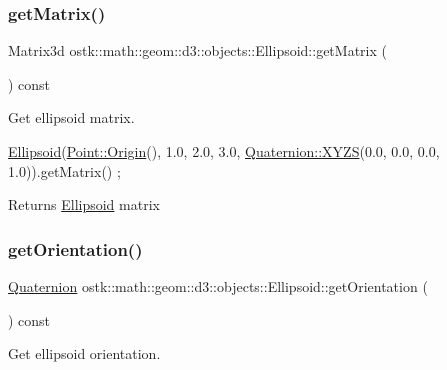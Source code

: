 \subsubsection{\texorpdfstring{get\+Matrix()}{getMatrix()}}
{\footnotesize\ttfamily Matrix3d ostk\+::math\+::geom\+::d3\+::objects\+::\+Ellipsoid\+::get\+Matrix (\begin{DoxyParamCaption}{ }\end{DoxyParamCaption}) const}



Get ellipsoid matrix. 


\begin{DoxyCode}
\hyperlink{classostk_1_1math_1_1geom_1_1d3_1_1objects_1_1_ellipsoid_a106c71abf9503f3d06b2613c1c7e9d65}{Ellipsoid}(\hyperlink{classostk_1_1math_1_1geom_1_1d3_1_1objects_1_1_point_a079c199f08b015d456d02728a71b534c}{Point::Origin}(), 1.0, 2.0, 3.0, \hyperlink{classostk_1_1math_1_1geom_1_1d3_1_1trf_1_1rot_1_1_quaternion_ac57ea57a4033622ed1389101b2e58c76}{Quaternion::XYZS}(0.0, 0.0, 
      0.0, 1.0)).getMatrix() ;
\end{DoxyCode}


\begin{DoxyReturn}{Returns}
\hyperlink{classostk_1_1math_1_1geom_1_1d3_1_1objects_1_1_ellipsoid}{Ellipsoid} matrix 
\end{DoxyReturn}
\mbox{\label{classostk_1_1math_1_1geom_1_1d3_1_1objects_1_1_ellipsoid_a3e273d94d0ff1d40e3588d5ee2366ec9}} 
\subsubsection{\texorpdfstring{get\+Orientation()}{getOrientation()}}
{\footnotesize\ttfamily \hyperlink{classostk_1_1math_1_1geom_1_1d3_1_1trf_1_1rot_1_1_quaternion}{Quaternion} ostk\+::math\+::geom\+::d3\+::objects\+::\+Ellipsoid\+::get\+Orientation (\begin{DoxyParamCaption}{ }\end{DoxyParamCaption}) const}



Get ellipsoid orientation. 



